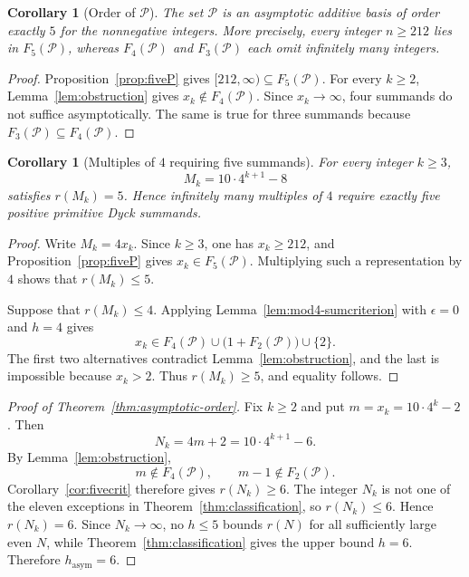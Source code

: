 \documentclass[11pt]{article}
\theoremstyle{plain}
\newtheorem{corollary}[theorem]{Corollary}
\theoremstyle{definition}
\newcommand{\Pset}{\mathcal P}
\begin{document}
\begin{corollary}[Order of $\Pset$]\label{cor:orderfive}
The set $\Pset$ is an asymptotic additive basis of order exactly $5$ for
the nonnegative integers.  More precisely, every integer $n\geq212$ lies
in $F_5(\Pset)$, whereas $F_4(\Pset)$ and $F_3(\Pset)$ each omit
infinitely many integers.
\end{corollary}

\begin{proof}
Proposition~\ref{prop:fiveP} gives
$[212,\infty)\subseteq F_5(\Pset)$.  For every $k\geq2$,
Lemma~\ref{lem:obstruction} gives $x_k\notin F_4(\Pset)$.  Since
$x_k\to\infty$, four summands do not suffice asymptotically.  The same is
true for three summands because $F_3(\Pset)\subseteq F_4(\Pset)$.
\end{proof}

\begin{corollary}[Multiples of $4$ requiring five summands]
\label{cor:five-multiples}
For every integer $k\geq3$,
\[
 M_k=10\cdot4^{k+1}-8
\]
satisfies $r(M_k)=5$.  Hence infinitely many multiples of $4$ require
exactly five positive primitive Dyck summands.
\end{corollary}

\begin{proof}
Write $M_k=4x_k$.  Since $k\geq3$, one has $x_k\geq212$, and
Proposition~\ref{prop:fiveP} gives $x_k\in F_5(\Pset)$.  Multiplying such
a representation by $4$ shows that $r(M_k)\leq5$.

Suppose that $r(M_k)\leq4$.  Applying
Lemma~\ref{lem:mod4-sumcriterion} with $\epsilon=0$ and $h=4$ gives
\[
 x_k\in
 F_4(\Pset)
 \cup\bigl(1+F_2(\Pset)\bigr)
 \cup\{2\}.
\]
The first two alternatives contradict Lemma~\ref{lem:obstruction}, and
the last is impossible because $x_k>2$.  Thus $r(M_k)\geq5$, and equality
follows.
\end{proof}

\begin{proof}[Proof of Theorem~\ref{thm:asymptotic-order}]
Fix $k\geq2$ and put $m=x_k=10\cdot4^k-2$.  Then
\[
 N_k=4m+2=10\cdot4^{k+1}-6.
\]
By Lemma~\ref{lem:obstruction},
\[
 m\notin F_4(\Pset),
 \qquad
 m-1\notin F_2(\Pset).
\]
Corollary~\ref{cor:fivecrit} therefore gives $r(N_k)\geq6$.  The integer
$N_k$ is not one of the eleven exceptions in
Theorem~\ref{thm:classification}, so $r(N_k)\leq6$.  Hence $r(N_k)=6$.
Since $N_k\to\infty$, no $h\leq5$ bounds $r(N)$ for all sufficiently
large even $N$, while Theorem~\ref{thm:classification} gives the upper
bound $h=6$.  Therefore $h_{\mathrm{asym}}=6$.
\end{proof}
\end{document}
